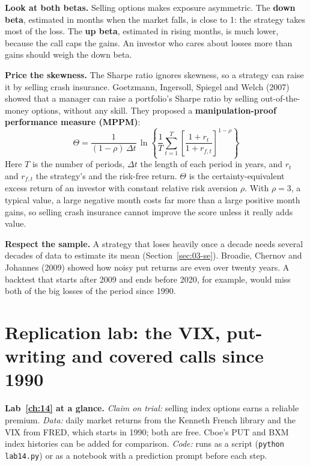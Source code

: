 \textbf{Look at both betas.} Selling options makes exposure asymmetric. The \textbf{down beta}, estimated in months when the market falls, is close to 1: the strategy takes most of the loss. The \textbf{up beta}, estimated in rising months, is much lower, because the call caps the gains. An investor who cares about losses more than gains should weigh the down beta.

\textbf{Price the skewness.} The Sharpe ratio ignores skewness, so a strategy can raise it by selling crash insurance. Goetzmann, Ingersoll, Spiegel and Welch (2007) showed that a manager can raise a portfolio's Sharpe ratio by selling out-of-the-money options, without any skill. They proposed a \textbf{manipulation-proof performance measure (MPPM)}:
\begin{equation}
  \Theta = \frac{1}{(1 - \rho)\,\Delta t}\,\ln\!\left\{\frac{1}{T}\sum_{t=1}^{T}\left[\frac{1 + r_t}{1 + r_{f,t}}\right]^{1-\rho}\right\}
  \label{eq:14-mppm}
\end{equation}
Here $T$ is the number of periods, $\Delta t$ the length of each period in years, and $r_t$ and $r_{f,t}$ the strategy's and the risk-free return. $\Theta$ is the certainty-equivalent excess return of an investor with constant relative risk aversion $\rho$. With $\rho = 3$, a typical value, a large negative month costs far more than a large positive month gains, so selling crash insurance cannot improve the score unless it really adds value.

\textbf{Respect the sample.} A strategy that loses heavily once a decade needs several decades of data to estimate its mean (Section~\ref{sec:03-se}). Broadie, Chernov and Johannes (2009) showed how noisy put returns are even over twenty years. A backtest that starts after 2009 and ends before 2020, for example, would miss both of the big losses of the period since 1990.

\section{Replication lab: the VIX, put-writing and covered calls since 1990}
\label{sec:14-lab}

\begin{callout}
\textbf{Lab~\ref{ch:14} at a glance.} \emph{Claim on trial:} selling index options earns a reliable premium. \emph{Data:} daily market returns from the Kenneth French library and the VIX from FRED, which starts in 1990; both are free. Cboe's PUT and BXM index histories can be added for comparison. \emph{Code:} runs as a script (\texttt{python lab14.py}) or as a notebook with a prediction prompt before each step.
\end{callout}

